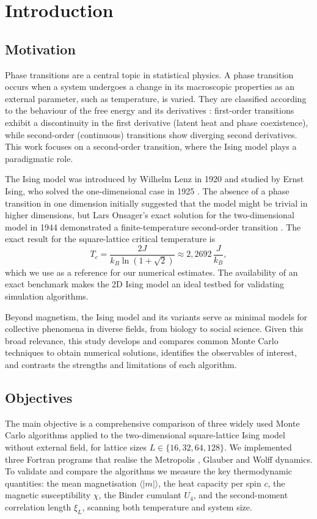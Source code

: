 \chapter{Introduction}

\section{Motivation}

Phase transitions are a central topic in statistical physics. A phase transition occurs when a system undergoes a change in its macroscopic properties as an external parameter, such as temperature, is varied. They are classified according to the behaviour of the free energy and its derivatives \citep{Stanley1971}: first-order transitions exhibit a discontinuity in the first derivative (latent heat and phase coexistence), while second-order (continuous) transitions show diverging second derivatives. This work focuses on a second-order transition, where the Ising model plays a paradigmatic role.

The Ising model was introduced by Wilhelm Lenz in 1920 and studied by Ernst Ising, who solved the one-dimensional case in 1925 \citep{Ising1925}. The absence of a phase transition in one dimension initially suggested that the model might be trivial in higher dimensions, but Lars Onsager's exact solution for the two-dimensional model in 1944 demonstrated a finite-temperature second-order transition \citep{Onsager1944,Peierls1936}. The exact result for the square-lattice critical temperature is
\begin{equation}
T_c = \frac{2J}{k_B \ln(1+\sqrt{2})} \approx 2{,}2692\,\frac{J}{k_B},
\label{eq:Tc_onsager}
\end{equation}
which we use as a reference for our numerical estimates. The availability of an exact benchmark makes the 2D Ising model an ideal testbed for validating simulation algorithms.

Beyond magnetism, the Ising model and its variants serve as minimal models for collective phenomena in diverse fields, from biology to social science. Given this broad relevance, this study develops and compares common Monte Carlo techniques to obtain numerical solutions, identifies the observables of interest, and contrasts the strengths and limitations of each algorithm.

\section{Objectives}
The main objective is a comprehensive comparison of three widely used Monte Carlo algorithms applied to the two-dimensional square-lattice Ising model without external field, for lattice sizes $L\in\{16,32,64,128\}$. We implemented three Fortran programs that realise the Metropolis \citep{Metropolis1953}, Glauber \citep{Glauber1963} and Wolff \citep{Wolff1989} dynamics. To validate and compare the algorithms we measure the key thermodynamic quantities: the mean magnetisation $\langle|m|\rangle$, the heat capacity per spin $c$, the magnetic susceptibility $\chi$, the Binder cumulant $U_4$, and the second-moment correlation length $\xi_L$, scanning both temperature and system size.

